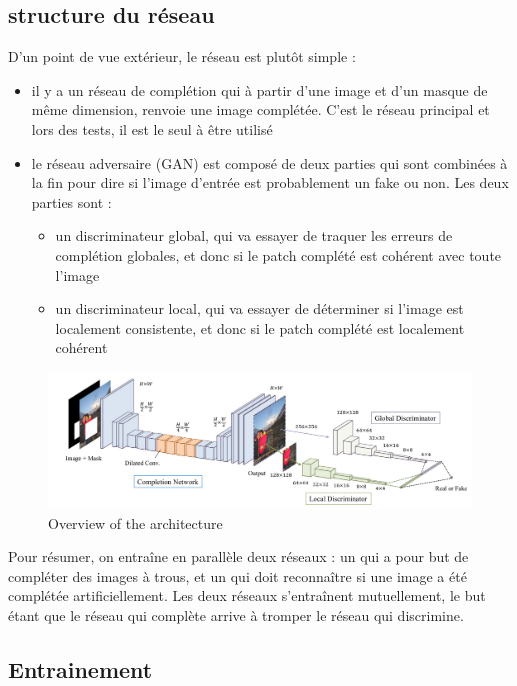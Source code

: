 \documentclass[12pt]{article}
\begin{document}
\subsection{structure du réseau}
D'un point de vue extérieur, le réseau est plutôt simple : 
\begin{itemize}
    \item il y a un réseau de complétion qui à partir d'une image et d'un masque de même dimension, renvoie une image complétée. C'est le réseau principal et lors des tests, il est le seul à être utilisé
    \item le réseau adversaire (GAN) est composé de deux parties qui sont combinées à la fin pour dire si l'image d'entrée est probablement un fake ou non. Les deux parties sont : 
    \begin{itemize}
        \item un discriminateur global, qui va essayer de traquer les erreurs de complétion globales, et donc si le patch complété est cohérent avec toute l'image
        \item un discriminateur local, qui va essayer de déterminer si l'image est localement consistente, et donc si le patch complété est localement cohérent
    \end{itemize}
\end{itemize}

\begin{figure}[H]
    \includegraphics[width=1.0\textwidth]{Images/network_overview.png}
    \caption{Overview of the architecture}
\end{figure}

Pour résumer, on entraîne en parallèle deux réseaux : un qui a pour but de compléter des images à trous, et un qui doit reconnaître si une image a été complétée artificiellement. Les deux réseaux s'entraînent mutuellement, le but étant que le réseau qui complète arrive à tromper le réseau qui discrimine.

\subsection{Entrainement}
\end{document}
